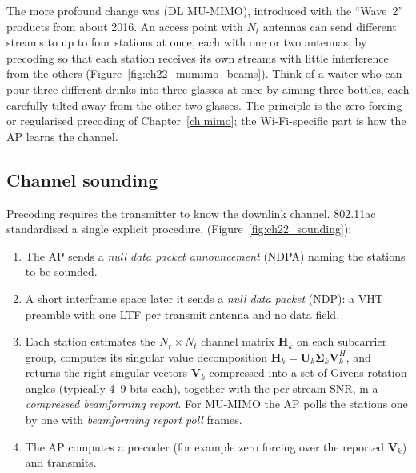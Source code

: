 The more profound change was  (DL MU-MIMO), introduced with the
``Wave~2'' products from about 2016. An access point with $N_t$ antennas can send different streams
to up to four stations at once, each with one or two antennas, by precoding so that each station
receives its own streams with little interference from the others
(Figure~\ref{fig:ch22_mumimo_beams}). Think of a waiter who can pour three different drinks into
three glasses at once by aiming three bottles, each carefully tilted away from the other two glasses.
The principle is the zero-forcing or regularised precoding of Chapter~\ref{ch:mimo}; the
Wi-Fi-specific part is how the AP learns the channel.

\subsection{Channel sounding}

Precoding requires the transmitter to know the downlink channel. 802.11ac standardised a single
explicit procedure,  (Figure~\ref{fig:ch22_sounding}):
\begin{enumerate}
\item The AP sends a \emph{null data packet announcement} (NDPA) naming the stations to be sounded.
\item A short interframe space later it sends a \emph{null data packet} (NDP): a VHT preamble with
one LTF per transmit antenna and no data field.
\item Each station estimates the $N_r\times N_t$ channel matrix $\mathbf{H}_k$ on each subcarrier
group, computes its singular value decomposition
$\mathbf{H}_k=\mathbf{U}_k\boldsymbol{\Sigma}_k\mathbf{V}_k^H$, and returns the right singular vectors
$\mathbf{V}_k$ compressed into a set of Givens rotation angles (typically 4--9 bits each), together
with the per-stream SNR, in a \emph{compressed beamforming report}. For MU-MIMO the AP polls the
stations one by one with \emph{beamforming report poll} frames.
\item The AP computes a precoder (for example zero forcing over the reported $\mathbf{V}_k$) and
transmits.
\end{enumerate}

